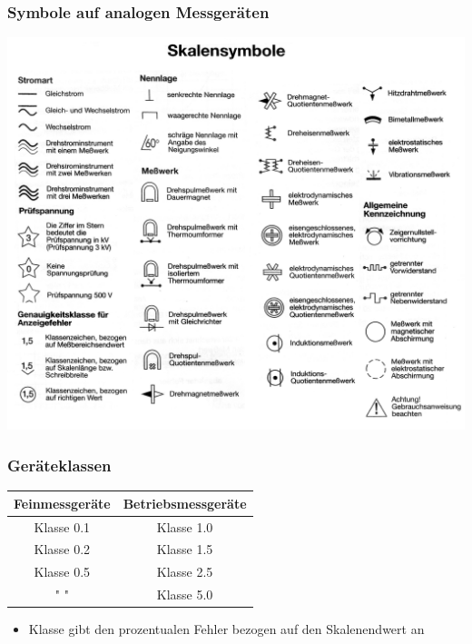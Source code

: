 \begin{frame}
	\frametitle{Symbole auf analogen Messgeräten}
	\includegraphics[scale=0.13]{a16/Symbole.png}
\end{frame}

\begin{frame}
	\frametitle{Geräteklassen}
	\begin{center}
	\begin{tabular}{|c|c|}
		\hline
		Feinmessgeräte & Betriebsmessgeräte\\ \hline
		Klasse 0.1 & Klasse 1.0 \\ \hline
		Klasse 0.2 & Klasse 1.5 \\ \hline
		Klasse 0.5 & Klasse 2.5 \\ \hline
		" " & Klasse 5.0 \\ \hline
	\end{tabular}
	\end{center}
	\begin{itemize}
		\item	Klasse gibt den prozentualen Fehler bezogen auf den Skalenendwert an
	\end{itemize}
\end{frame}

